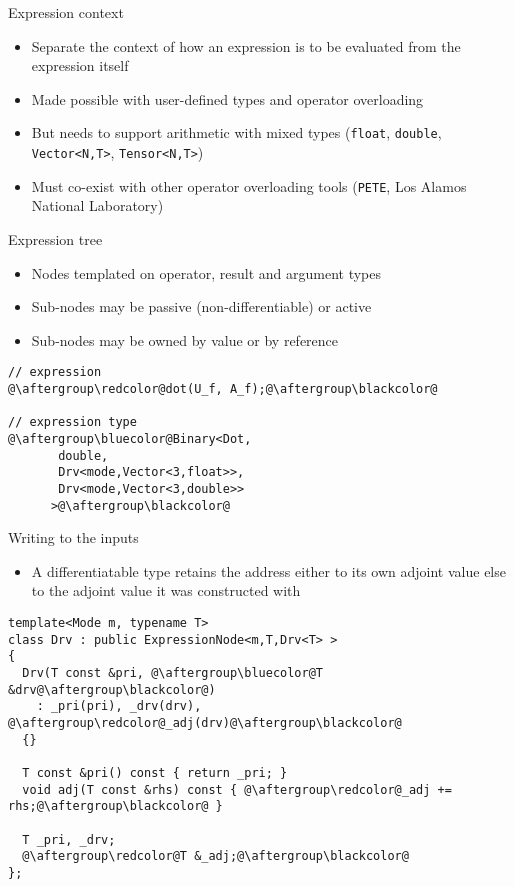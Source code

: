 \documentclass[xcolor=dvipsnames]{beamer}
\begin{document}
\begin{frame}{Expression context}
\begin{itemize}
\item Separate the context of how an expression is to be evaluated from the expression itself \vspace{5mm}
\item Made possible with user-defined types and operator overloading \vspace{5mm}
\item But needs to support arithmetic with mixed types ({\color{blue}\texttt{float}, \texttt{double}, \texttt{Vector<N,T>}, \texttt{Tensor<N,T>}}) \vspace{5mm}
\item Must co-exist with other operator overloading tools ({\color{blue}\texttt{PETE}}, Los Alamos National Laboratory) \vspace{5mm}
\end{itemize}
\end{frame}


\begin{frame}[fragile]{Expression tree}
\begin{itemize}
\item Nodes templated on operator, result and argument types \vspace{2mm}
\item Sub-nodes may be passive (non-differentiable) or active \vspace{2mm}
\item Sub-nodes may be owned by value or by reference \vspace{2mm}
\end{itemize}
\begin{lstlisting}
// expression
@\aftergroup\redcolor@dot(U_f, A_f);@\aftergroup\blackcolor@

// expression type
@\aftergroup\bluecolor@Binary<Dot,
       double,
       Drv<mode,Vector<3,float>>,
       Drv<mode,Vector<3,double>>
      >@\aftergroup\blackcolor@
\end{lstlisting}
\end{frame}


\begin{frame}[fragile]{Writing to the inputs}
\begin{itemize}
\item A differentiatable type retains the address either to its own adjoint value else to the adjoint value it was constructed with \vspace{2mm}
\end{itemize}
\begin{lstlisting}
template<Mode m, typename T>
class Drv : public ExpressionNode<m,T,Drv<T> >
{
  Drv(T const &pri, @\aftergroup\bluecolor@T &drv@\aftergroup\blackcolor@)
    : _pri(pri), _drv(drv), @\aftergroup\redcolor@_adj(drv)@\aftergroup\blackcolor@
  {}

  T const &pri() const { return _pri; }
  void adj(T const &rhs) const { @\aftergroup\redcolor@_adj += rhs;@\aftergroup\blackcolor@ }

  T _pri, _drv;
  @\aftergroup\redcolor@T &_adj;@\aftergroup\blackcolor@
};
\end{lstlisting}
\end{frame}
\end{document}
